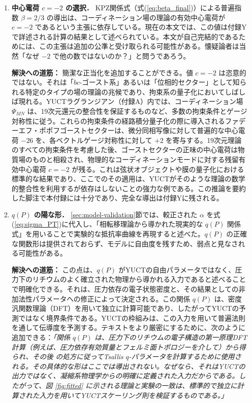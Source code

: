 \documentclass[11pt,a4paper]{article}
\theoremstyle{remark}
\begin{document}
	\begin{enumerate}
		\item \textbf{中心電荷 \(c = -2\) の選択．} KPZ関係式（式(\ref{eq:beta_final})）による普遍指数 \(\beta = 2/3\) の導出は、コーディネーション場の理論の有効中心電荷が \(c = -2\) であるという主張に依存している。現在の本文では、この値は付録Yで詳述される計算の結果として述べられている。本文が自己完結的であるためには、この主張は追加の公準と受け取られる可能性がある。懐疑論者は当然「なぜ \(-2\) で他の数ではないのか？」と問うであろう。
		
		\textbf{解決への道筋：} 簡潔な正当化を追加することができる。値 \(c = -2\) は恣意的ではない。それは「\(bc\)-ゴースト系」あるいは「位相的セクター」として知られる特定のタイプの場の理論の兆候であり、拘束系の量子化においてしばしば現れる。YUCTラグランジアン（付録A）内では、コーディネーション場 \(\Psi_{MN}\) は、19次元還元の整合性を保証するものなど、多数の拘束条件とゲージ対称性に従う。これらの拘束条件の経路積分量子化の際に導入されるファデーエフ・ポポフゴーストセクターは、微分同相写像に対して普遍的な中心電荷 \(-26\) を、各ベクトルゲージ対称性に対して \(+2\) を寄与する。19次元理論のすべての拘束条件を考慮した後、ゴーストセクターの正味の中心電荷は物質場のものと相殺され、物理的なコーディネーションモードに対する残留有効中心電荷 \(c = -2\) が残る。これは弦状オブジェクトや膜の量子化における標準的な結果であり、ここでのその適用は、YUCTがそのような理論の数学的整合性を利用するが依存はしないことの強力な例である。この推論を要約した脚注で本付録には十分であり、完全な導出は付録Yに残される。
		
		\item \textbf{\(q(P)\) の陽な形．} \ref{sec:model-validation}節では、較正された \(\alpha\) を式(\ref{eq:sigma_PT})に代入し、「相転移理論から導かれた現実的な \(q(P)\) 関係式」を用いることで実験的な抵抗率曲線を再現すると述べた。\(q(P)\) の正確な関数形は提供されておらず、モデルに自由度を残すため、弱点と見なされる可能性がある。
		
		\textbf{解決への道筋：} この点は、\(q(P)\) がYUCTの自由パラメータではなく、圧力下のリチウムのよく確立された物理から導かれる入力であると述べることで明確化できる。それは、圧力依存の電子状態密度と、その結果としての非加法性パラメータへの修正によって決定される。この関係 \(q(P)\) は、密度汎関数理論（DFT）を用いて独立に計算可能であり、したがってYUCTの予測ではなく境界条件である。YUCTの枠組みは、この入力を用いて普遍法則を通して伝導度を予測する。テキストをより厳密にするために、次のように追加できる：\textit{「関係 \(q(P)\) は、圧力下のリチウムの電子構造の第一原理DFT計算（例えば、圧力依存有効質量とフェルミ面トポロジーを介して）から得られ、その後 \cite{Tsallis2009} の処方に従ってTsallis \(q\)-パラメータを計算するために使用される。その具体的な形はここでは導出されない。なぜなら、それはYUCTの出力ではなく、凝縮系物理学からの明確に定義された入力だからである。したがって、図 \ref{fig:fitted} に示される理論と実験の一致は、標準的で独立に計算された入力を用いてYUCTスケーリング則を検証するものである。」}
		

\end{enumerate}
\end{document}
